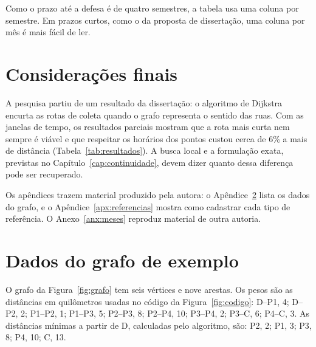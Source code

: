 \documentclass[eq,capa]{texufpel}
\begin{document}
Como o prazo até a defesa é de quatro semestres, a tabela usa uma coluna por
semestre. Em prazos curtos, como o da proposta de dissertação, uma coluna por
mês é mais fácil de ler.

\chapter{Considerações finais}
\label{cap:consideracoes}

A pesquisa partiu de um resultado da dissertação: o algoritmo de Dijkstra
encurta as rotas de coleta quando o grafo representa o sentido das ruas. Com
as janelas de tempo, os resultados parciais mostram que a rota mais curta nem
sempre é viável e que respeitar os horários dos pontos custou cerca de 6\% a
mais de distância (Tabela~\ref{tab:resultados}). A busca local e a formulação
exata, previstas no Capítulo~\ref{cap:continuidade}, devem dizer quanto dessa
diferença pode ser recuperado.

Os apêndices trazem material produzido pela autora: o Apêndice~\ref{apx:dados}
lista os dados do grafo, e o Apêndice~\ref{apx:referencias} mostra como
cadastrar cada tipo de referência. O Anexo~\ref{anx:meses} reproduz material de
outra autoria.




\apendices

\chapter{Dados do grafo de exemplo}
\label{apx:dados}

O grafo da Figura~\ref{fig:grafo} tem seis vértices e nove arestas. Os pesos
são as distâncias em quilômetros usadas no código da
Figura~\ref{fig:codigo}: D--P1, 4; D--P2, 2; P1--P2, 1; P1--P3, 5; P2--P3, 8;
P2--P4, 10; P3--P4, 2; P3--C, 6; P4--C, 3. As distâncias mínimas a partir de
D, calculadas pelo algoritmo, são: P2, 2; P1, 3; P3, 8; P4, 10; C, 13.
\end{document}
